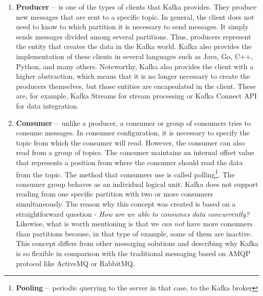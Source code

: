\begin{enumerate}
    \item \textbf{Producer} \---\ is one of the types of clients that Kafka provides. They produce new messages that are sent to a specific topic. In general, the client does not need to know to which partition it is necessary to send messages. It simply sends messages divided among several partitions. Thus, producers represent the entity that creates the data in the Kafka world. Kafka also provides the implementation of these clients in several languages such as Java, Go, C++, Python, and many others. Noteworthy, Kafka also provides the client with a higher abstraction, which means that it is no longer necessary to create the producers themselves, but those entities are encapsulated in the client. These are, for example, Kafka Streams for stream processing or Kafka Connect API for data integration.
    
    \item \textbf{Consumer} \---\ unlike a producer, a consumer or group of consumers tries to consume messages. In consumer configuration, it is necessary to specify the topic from which the consumer will read. However, the consumer can also read from a group of topics. The consumer maintains an internal offset value that represents a position from where the consumer should read the data from the topic. The method that consumers use is called polling\footnote{\textbf{Pooling} \---\ periodic querying to the server in that case, to the Kafka broker}. The consumer group behaves as an individual logical unit. Kafka does not support reading from one specific partition with two or more consumers simultaneously. The reason why this concept was created is based on a straightforward question - \emph{How are we able to consumes data concurrently?} Likewise, what is worth mentioning is that we \emph{can not} have more consumers than partitions because, in that type of example, some of them are inactive. This concept differs from other messaging solutions and describing why Kafka is so flexible in comparison with the traditional messaging based on AMQP protocol like ActiveMQ or RabbitMQ.
    

\end{enumerate}
